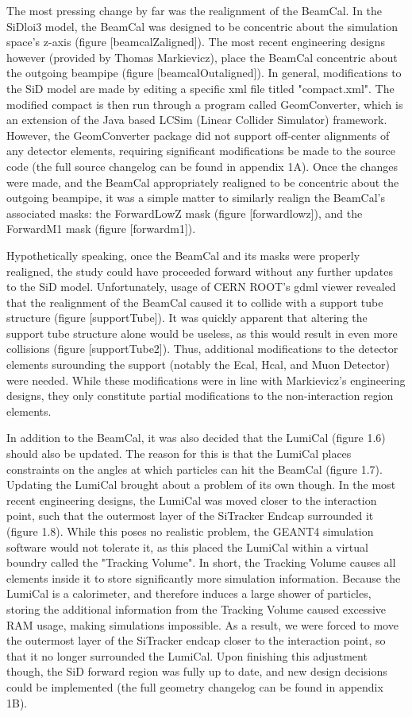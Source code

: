\documentclass{report}
\begin{document}
            The most pressing change by far was the realignment of the BeamCal. In the SiDloi3 model, the BeamCal was designed to be concentric about the simulation space's z-axis (figure [beamcalZaligned]). The most recent engineering designs however (provided by Thomas Markievicz), place the BeamCal concentric about the outgoing beampipe (figure [beamcalOutaligned]). In general, modifications to the SiD model are made by editing a specific xml file titled "compact.xml". The modified compact is then run through a program called GeomConverter, which is an extension of the Java based LCSim (Linear Collider Simulator) framework. However, the GeomConverter package did not support off-center alignments of any detector elements, requiring significant modifications be made to the source code (the full source changelog can be found in appendix 1A). Once the changes were made, and the BeamCal appropriately realigned to be concentric about the outgoing beampipe, it was a simple matter to similarly realign the BeamCal's associated masks: the ForwardLowZ mask (figure [forwardlowz]), and the ForwardM1 mask (figure [forwardm1]). 

            Hypothetically speaking, once the BeamCal and its masks were properly realigned, the study could have proceeded forward without any further updates to the SiD model. Unfortunately, usage of CERN ROOT's gdml viewer revealed that the realignment of the BeamCal caused it to collide with a support tube structure (figure [supportTube]). It was quickly apparent that altering the support tube structure alone would be useless, as this would result in even more collisions (figure [supportTube2]). Thus, additional modifications to the detector elements surounding the support (notably the Ecal, Hcal, and Muon Detector) were needed. While these modifications were in line with Markievicz's engineering designs, they only constitute partial modifications to the non-interaction region elements.

            In addition to the BeamCal, it was also decided that the LumiCal (figure 1.6) should also be updated. The reason for this is that the LumiCal places constraints on the angles at which particles can hit the BeamCal (figure 1.7). Updating the LumiCal brought about a problem of its own though. In the most recent engineering designs, the LumiCal was moved closer to the interaction point, such that the outermost layer of the SiTracker Endcap surrounded it (figure 1.8). While this poses no realistic problem, the GEANT4 simulation software would not tolerate it, as this placed the LumiCal within a virtual boundry called the "Tracking Volume". In short, the Tracking Volume causes all elements inside it to store significantly more simulation information. Because the LumiCal is a calorimeter, and therefore induces a large shower of particles, storing the additional information from the Tracking Volume caused excessive RAM usage, making simulations impossible. As a result, we were forced to move the outermost layer of the SiTracker endcap closer to the interaction point, so that it no longer surrounded the LumiCal. Upon finishing this adjustment though, the SiD forward region was fully up to date, and new design decisions could be implemented (the full geometry changelog can be found in appendix 1B).
\end{document}
